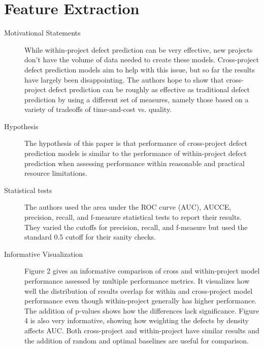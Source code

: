 \documentclass[english]{article}
\begin{document}
\section*{Feature Extraction}
\begin{description}
\item[{Motivational Statements}]  While within-project defect prediction can be very effective, new projects don't have the volume of data needed to create these models. Cross-project defect prediction models aim to help with this issue, but so far the results have largely been disappointing. The authors hope to show that cross-project defect prediction can be roughly as effective as traditional defect prediction by using a different set of measures, namely those based on a variety of tradeoffs of time-and-cost vs. quality.
\item[{Hypothesis}] The hypothesis of this paper is that performance of cross-project defect prediction models is similar to the performance of within-project defect prediction when assessing performance within reasonable and practical resource limitations.
\item[{Statistical tests}] The authors used the area under the ROC curve (AUC), AUCCE, precision, recall, and f-measure statistical tests to report their results. They varied the cutoffs for precision, recall, and f-measure but used the standard 0.5 cutoff for their sanity checks.
\item[{Informative Visualization}] Figure 2 gives an informative comparison of cross and within-project model performance assessed by multiple performance metrics. It visualizes how well the distribution of results overlap for within and cross-project model performance even though within-project generally has higher performance. The addition of p-values shows how the differences lack significance. Figure 4 is also very informative, showing how weighting the defects by density affects AUC. Both cross-project and within-project have similar results and the addition of random and optimal baselines are useful for comparison.

\end{description}
\end{document}
